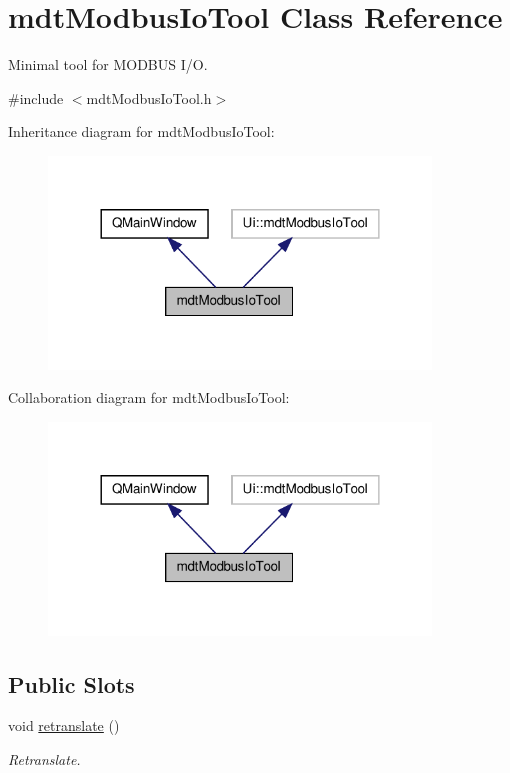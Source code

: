\hypertarget{classmdt_modbus_io_tool}{\section{mdt\-Modbus\-Io\-Tool Class Reference}
\label{classmdt_modbus_io_tool}
}


Minimal tool for M\-O\-D\-B\-U\-S I/\-O.  




{\ttfamily \#include $<$mdt\-Modbus\-Io\-Tool.\-h$>$}



Inheritance diagram for mdt\-Modbus\-Io\-Tool\-:\nopagebreak
\begin{figure}[H]
\begin{center}
\leavevmode
\includegraphics[width=288pt]{classmdt_modbus_io_tool__inherit__graph}
\end{center}
\end{figure}


Collaboration diagram for mdt\-Modbus\-Io\-Tool\-:\nopagebreak
\begin{figure}[H]
\begin{center}
\leavevmode
\includegraphics[width=288pt]{classmdt_modbus_io_tool__coll__graph}
\end{center}
\end{figure}
\subsection*{Public Slots}
\begin{DoxyCompactItemize}
\item 
void \hyperlink{classmdt_modbus_io_tool_a5e0ccfb8e352242fffc3f65f442f4d2f}{retranslate} ()
\begin{DoxyCompactList}\small\item\em Retranslate. \end{DoxyCompactList}\end{DoxyCompactItemize}
